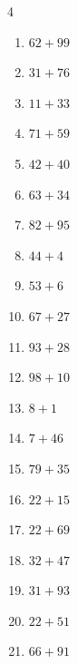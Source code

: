 \begin{multicols}{4}
\begin{enumerate}
\columnbreak %

\resetques

  \item $62+99$
        \phantom{$=161$}

  \item $31+76$
        \phantom{$=107$}

  \item $11+33$
        \phantom{$=44$}

  \item $71+59$
        \phantom{$=130$}

  \item $42+40$
        \phantom{$=82$}

  \item $63+34$
        \phantom{$=97$}

  \item $82+95$
        \phantom{$=177$}

  \item $44+4$
        \phantom{$=48$}

  \item $53+6$
        \phantom{$=59$}

  \item $67+27$
        \phantom{$=94$}

  \item $93+28$
        \phantom{$=121$}

  \item $98+10$
        \phantom{$=108$}

  \item $8+1$
        \phantom{$=9$}

  \item $7+46$
        \phantom{$=53$}

  \item $79+35$
        \phantom{$=114$}

  \item $22+15$
        \phantom{$=37$}

  \item $22+69$
        \phantom{$=91$}

  \item $32+47$
        \phantom{$=79$}

  \item $31+93$
        \phantom{$=124$}

  \item $22+51$
        \phantom{$=73$}

  \item $66+91$
        \phantom{$=157$}


\end{enumerate}
\end{multicols}
